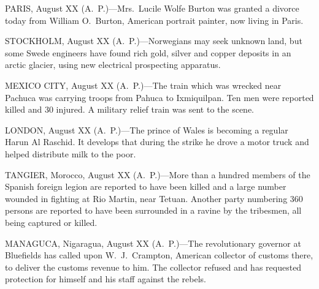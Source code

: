 \documentclass{newspaper1920}
\begin{document}
\begin{multicols}{3}



PARIS, August XX (A.~P.)---Mrs.~Lucile Wolfe Burton was granted a
divorce today from William O.\ Burton, American portrait painter, now
living in Paris.

\halfrule


STOCKHOLM, August XX (A.~P.)---Norwegians may seek unknown land, but
some Swede engineers have found rich gold, silver and copper deposits
in an arctic glacier, using new electrical prospecting apparatus.

\halfrule


MEXICO CITY, August XX (A.~P.)---The train which was wrecked near
Pachuca was carrying troops from Pahuca to Ixmiquilpan.  Ten men were
reported killed and 30 injured.  A military relief train was sent to
the scene.

\halfrule


LONDON, August XX (A.~P.)---The prince of Wales is becoming a regular
Harun Al Raschid.  It develops that during the strike he drove a motor
truck and helped distribute milk to the poor.

\halfrule


TANGIER, Morocco, August XX (A.~P.)---More than a hundred members of
the Spanish foreign legion are reported to have been killed and a
large number wounded in fighting at Rio Martin, near Tetuan.  Another
party numbering 360 persons are reported to have been surrounded in a
ravine by the tribesmen, all being captured or killed.

\halfrule


MANAGUCA, Nigaragua, August XX (A.~P.)---The revolutionary governor at
Bluefields has called upon W.~J.~Crampton, American collector of
customs there, to deliver the customs revenue to him.  The collector
refused and has requested protection for himself and his staff against
the rebels.

\fullrule



\end{multicols}
\end{document}

